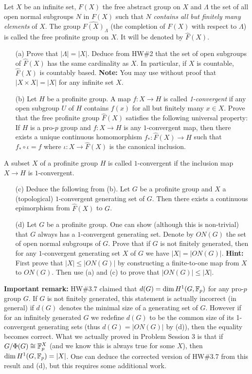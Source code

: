 \documentclass[12pt]{amsart}
\begin{document}
Let $X$ be an infinite set, $F(X)$ the free abstract group on $X$ and $\Lambda$ the set of all open normal
subgroups $N$ in $F(X)$ such that $N$ {\it contains all but finitely many elements} of $X$. The group 
$\widehat{F(X)}_{\Lambda}$ (the completion of $F(X)$ with respect to $\Lambda$) is called the free profinite group on $X$. It will be denoted by $\widehat F(X)$.
\begin{itemize}
\item[(a)] Prove that $|\Lambda|=|X|$. Deduce from HW\#2 that the set of open subgroups of $\widehat F(X)$ 
has the same cardinality as $X$. In particular, if $X$ is countable, $\widehat F(X)$ is countably based.
{\bf Note:} You may use without proof that $|X\times X|=|X|$ for any infinite set $X$.
\item[(b)] Let $H$ be a profinite group. A map $f:X\to H$ is called {\it 1-convergent} if any open
subgroup $U$ of $H$ contains $f(x)$ for all but finitely many $x\in X$. Prove that the free profinite group 
$\widehat F(X)$ satisfies the following universal property: If $H$ is a pro-$p$ group
and $f:X\to H$ is any $1$-convergent map, then there exists a unique continuous homomorphism
$f_*:\widehat F(X)\to H$ such that $f_* \circ \iota=f$ where $\iota: X\to \widehat F(X)$
is the canonical inclusion.
\end{itemize}
A subset $X$ of a profinite group $H$ is called $1$-convergent if the inclusion map $X\to H$ is $1$-convergent.
\begin{itemize}
\item[(c)] Deduce the following from (b). Let $G$ be a profinite group and $X$ a (topological) $1$-convergent generating set of $G$. Then there exists a continuous epimorphism from $\widehat F(X)$ to $G$.
\item[(d)] Let $G$ be a profinite group. 
One can show (although this is non-trivial) that $G$ always has a $1$-convergent generating set. 
Denote by $ON(G)$ the set of open normal subgroups of $G$. Prove that if $G$ is not finitely generated,
then for any $1$-convergent generating set $X$ of $G$ we have $|X|=|ON(G)|$. {\bf Hint:} First prove
that $|X|\leq |ON(G)|$ by constructing a finite-to-one map from $X$ to $ON(G)$. Then use (a) and (c)
to prove that $|ON(G)|\leq |X|$.
\end{itemize}
{\bf Important remark:} HW\#3.7 claimed that $d(G)=\dim H^1(G,{\mathbb F}_p)$ for any pro-$p$ group $G$. If $G$
is not finitely generated, this statement is actually incorrect (in general) if $d(G)$ denotes the minimal size of a generating set of $G$. However if for an infinitely generated $G$  we redefine
$d(G)$ to be the common size of its 1-convergent generating sets (thus $d(G)=|ON(G)|$ by (d)), then the equality becomes correct.
What we actually proved in Problem Session 3 is that if $G/\Phi(G)\cong {\mathbb F}_p^X$ (and we know this is always
true for some $X$), then $\dim H^1(G,{\mathbb F}_p)=|X|$. One can deduce the corrected version of HW\#3.7 from this result and (d), but this requires some additional work. 
\skv
\end{document}
